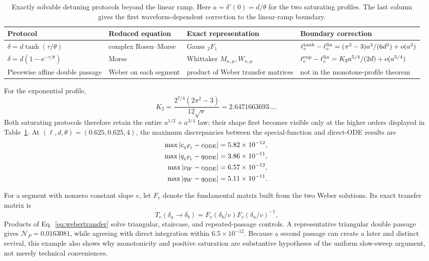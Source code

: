 \documentclass[reprint,superscriptaddress,floatfix,amsmath,amssymb,prresearch,aps]{revtex4-2}
\newcommand{\ee}{\mathrm{e}}
\begin{document}
\begin{table}[t]
\caption{Exactly solvable detuning protocols beyond the linear ramp. Here
\(a=\delta'(0)=d/\theta\) for the two saturating profiles. The last column
gives the first waveform-dependent correction to the linear-ramp boundary.}
\label{tab:exactprofiles}
\begin{ruledtabular}
\begin{tabular}{@{}p{}p{}
p{}p{}@{}}
Protocol & Reduced equation & Exact representation & Boundary correction\\
\hline
\(\delta=d\tanh(\tau/\theta)\)
& complex Rosen--Morse & Gauss \({}_2F_1\)
& \(\ell_c^{\tanh}-\ell_c^{\rm lin}
=(\pi^2-3)a^2/(6d^2)+o(a^2)\)\\
\(\delta=d(1-\ee^{-\tau/\theta})\)
& Morse & Whittaker \(M_{\kappa,\mu},W_{\kappa,\mu}\)
& \(\ell_c^{\exp}-\ell_c^{\rm lin}
=K_2a^{5/4}/(2d)+o(a^{5/4})\)\\
Piecewise affine double passage
& Weber on each segment & product of Weber transfer matrices
& not in the monotone-profile theorem\\
\end{tabular}
\end{ruledtabular}
\end{table}

For the exponential profile,
\begin{equation}
K_2=\frac{2^{7/4}(2\pi^2-3)}{12\sqrt\pi}
=2.6471663693\ldots .
\label{eq:Ktwoappendix}
\end{equation}
Both saturating protocols therefore retain the entire
\(a^{1/2}+a^{3/4}\) law; their shape first becomes visible only at the higher
orders displayed in Table~\ref{tab:exactprofiles}. At
\((\ell,d,\theta)=(0.625,0.625,4)\), the maximum discrepancies between the
special-function and direct-ODE results are
\begin{align}
\max|c_{{}_2F_1}-c_{\rm ODE}|&=5.82\times10^{-12},
\nonumber\\
\max|q_{{}_2F_1}-q_{\rm ODE}|&=3.86\times10^{-11},
\nonumber\\
\max|c_W-c_{\rm ODE}|&=6.57\times10^{-12},
\nonumber\\
\max|q_W-q_{\rm ODE}|&=5.11\times10^{-11}.
\label{eq:profilevalidation}
\end{align}

For a segment with nonzero constant slope \(v\), let \(F_v\) denote the
fundamental matrix built from the two Weber solutions. Its exact transfer
matrix is
\begin{equation}
T_v(\delta_a\!\to\!\delta_b)
=F_v(\delta_b/v)F_v(\delta_a/v)^{-1}.
\label{eq:webertransfer}
\end{equation}
Products of Eq.~\eqref{eq:webertransfer} solve triangular, staircase, and
repeated-passage controls. A representative triangular double passage gives
\(\mathcal N_P=0.0163081\), while agreeing with direct
integration within \(6.5\times10^{-12}\). Because a second passage can create
a later and distinct revival, this example also shows why monotonicity and
positive saturation are substantive hypotheses of the uniform slow-sweep
argument, not
merely technical conveniences.
\end{document}
